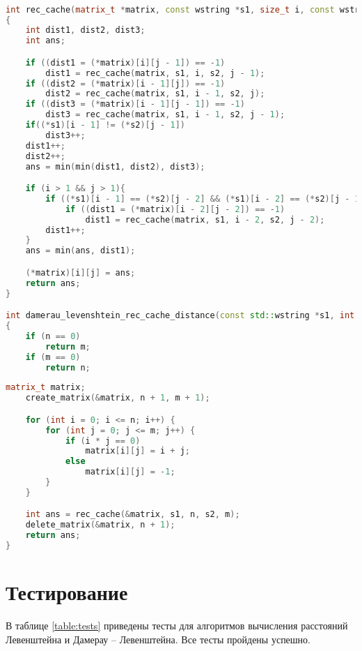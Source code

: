 \newpage
\begin{lstlisting}[label=rec_cache_damlev,caption=Реализация рекурсивного с кешированием алгоритма поиска
расстояния Дамерау – Левенштейна (начало), language=C++]

int rec_cache(matrix_t *matrix, const wstring *s1, size_t i, const wstring *s2, size_t j)
{
    int dist1, dist2, dist3;
    int ans;

    if ((dist1 = (*matrix)[i][j - 1]) == -1)
        dist1 = rec_cache(matrix, s1, i, s2, j - 1);
    if ((dist2 = (*matrix)[i - 1][j]) == -1)
        dist2 = rec_cache(matrix, s1, i - 1, s2, j);
    if ((dist3 = (*matrix)[i - 1][j - 1]) == -1)
        dist3 = rec_cache(matrix, s1, i - 1, s2, j - 1);
    if((*s1)[i - 1] != (*s2)[j - 1])
        dist3++;
    dist1++;
    dist2++;
    ans = min(min(dist1, dist2), dist3);

    if (i > 1 && j > 1){
        if ((*s1)[i - 1] == (*s2)[j - 2] && (*s1)[i - 2] == (*s2)[j - 1])
            if ((dist1 = (*matrix)[i - 2][j - 2]) == -1)
                dist1 = rec_cache(matrix, s1, i - 2, s2, j - 2);
        dist1++;
    }
    ans = min(ans, dist1);

    (*matrix)[i][j] = ans;
    return ans;
}

int damerau_levenshtein_rec_cache_distance(const std::wstring *s1, int n, const std::wstring *s2, int m)
{
    if (n == 0)
        return m;
    if (m == 0)
        return n;
\end{lstlisting}
\begin{lstlisting}[label=rec_cache_damlev1,caption=Реализация рекурсивного с кешированием алгоритма поиска
расстояния Дамерау – Левенштейна (конец), language=C++, firstnumber=last]
    matrix_t matrix;
    create_matrix(&matrix, n + 1, m + 1);

    for (int i = 0; i <= n; i++) {
        for (int j = 0; j <= m; j++) {
            if (i * j == 0)
                matrix[i][j] = i + j;
            else
                matrix[i][j] = -1;
        }
    }

    int ans = rec_cache(&matrix, s1, n, s2, m);
    delete_matrix(&matrix, n + 1);
    return ans;
}
\end{lstlisting}

\section{Тестирование}

В таблице \ref{table:tests} приведены тесты для алгоритмов вычисления расстояний Левенштейна и Дамерау -- Левенштейна. Все тесты пройдены успешно.

